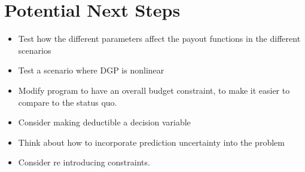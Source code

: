 \documentclass[11pt]{article}
\begin{document}
\section{Potential Next Steps}
\begin{itemize}
    \item Test how the different parameters affect the payout functions in the different scenarios
    \item Test a scenario where DGP is nonlinear
    \item Modify program to have an overall budget constraint, to make it easier to compare to the status quo. 
    \item Consider making deductible a decision variable
    \item Think about how to incorporate prediction uncertainty into the problem 
    \item Consider re introducing constraints. 
\end{itemize}
\end{document}
